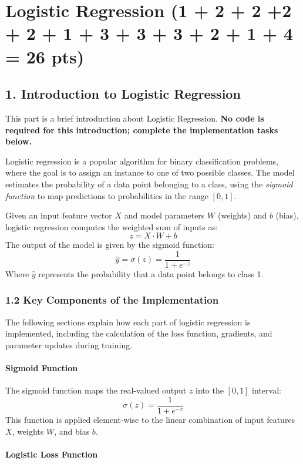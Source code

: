 \documentclass{article}
\newcounter{questionno}
\newcounter{partno}
\newcommand{\question}[1]{
\noindent
\newline
\stepcounter{questionno}
\setcounter{partno}{0}
{\bf \large Q\arabic{questionno} (#1 pts): }
}
\begin{document}
\clearpage

\section{Logistic Regression (1 + 2 + 2 +2 + 2 + 1 + 3 + 3 + 3 + 2 + 1 + 4 = 26 pts)}


\subsection*{1. Introduction to Logistic Regression}
This part is a brief introduction about Logistic Regression. \textbf{No code is required for this introduction; complete the implementation tasks below.}

Logistic regression is a popular algorithm for binary classification problems, where the goal is to assign an instance to one of two possible classes. The model estimates the probability of a data point belonging to a class, using the \textit{sigmoid function} to map predictions to probabilities in the range \([0,1]\).

Given an input feature vector \(X\) and model parameters \(W\) (weights) and \(b\) (bias), logistic regression computes the weighted sum of inputs as:
\[
z = X \cdot W + b
\]
The output of the model is given by the sigmoid function:
\[
\hat{y} = \sigma(z) = \frac{1}{1 + e^{-z}}
\]
Where \(\hat{y}\) represents the probability that a data point belongs to class 1.

\subsubsection*{1.2 Key Components of the Implementation}

The following sections explain how each part of logistic regression is implemented, including the calculation of the loss function, gradients, and parameter updates during training.

\paragraph{Sigmoid Function}

The sigmoid function maps the real-valued output \(z\) into the \([0,1]\) interval:
\[
\sigma(z) = \frac{1}{1 + e^{-z}}
\]
This function is applied element-wise to the linear combination of input features \(X\), weights \(W\), and bias \(b\).

\paragraph{Logistic Loss Function}
\end{document}
